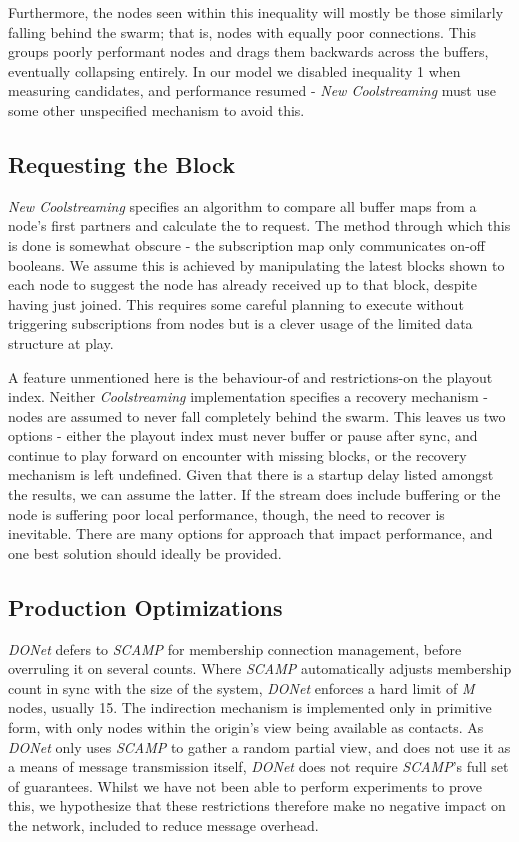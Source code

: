 \documentclass[12pt,a4paper]{article}
\begin{document}
Furthermore, the nodes seen within this inequality will mostly be those similarly falling behind the swarm; that is, nodes with equally poor connections. This groups poorly performant nodes and drags them backwards across the buffers, eventually collapsing entirely. In our model we disabled inequality 1 when measuring candidates, and performance resumed - \textit{New Coolstreaming} must use some other unspecified mechanism to avoid this.

\subsection{Requesting the Block} \label{problems:requesting}
\textit{New Coolstreaming} specifies an algorithm to compare all buffer maps from a node's first partners and calculate the  to request. The method through which this is done is somewhat obscure - the subscription map only communicates on-off booleans. We assume this is achieved by manipulating the latest blocks shown to each node to suggest the node has already received up to that block, despite having just joined. This requires some careful planning to execute without triggering subscriptions from nodes but is a clever usage of the limited data structure at play.

A feature unmentioned here is the behaviour-of and restrictions-on the playout index. Neither \textit{Coolstreaming} implementation specifies a recovery mechanism - nodes are assumed to never fall completely behind the swarm. This leaves us two options - either the playout index must never buffer or pause after sync, and continue to play forward on encounter with missing blocks, or the recovery mechanism is left undefined. Given that there is a startup delay listed amongst the results, we can assume the latter. If the stream does include buffering or the node is suffering poor local performance, though, the need to recover is inevitable. There are many options for approach that impact performance, and one best solution should ideally be provided.

\subsection{Production Optimizations} \label{problems:prodopt}
\textit{DONet} defers to \textit{SCAMP} for membership connection management,  before overruling it on several counts. Where \textit{SCAMP} automatically adjusts membership count in sync with the size of the system, \textit{DONet} enforces a hard limit of \textit{M} nodes, usually 15. The indirection mechanism is implemented only in primitive form, with only nodes within the origin's view being available as contacts. As \textit{DONet} only uses \textit{SCAMP} to gather a random partial view, and does not use it as a means of message transmission itself, \textit{DONet} does not require \textit{SCAMP}'s full set of guarantees. Whilst we have not been able to perform experiments to prove this, we hypothesize that these restrictions therefore make no negative impact on the network, included to reduce message overhead.
\end{document}
